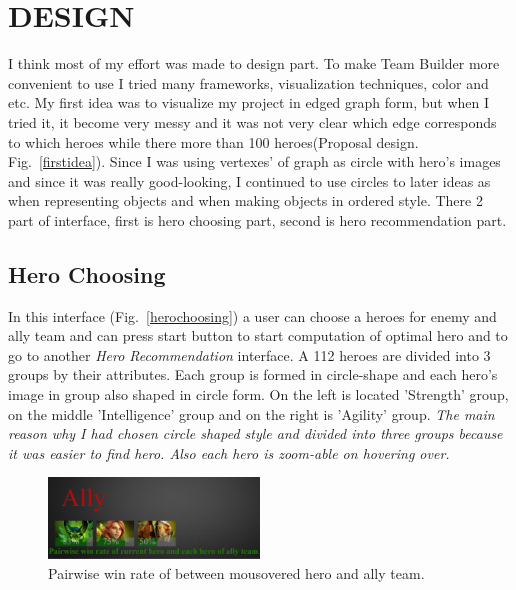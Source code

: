 \documentclass[twocolumn]{autart}    %
\begin{document}
\section{DESIGN}
I think most of my effort was made to design part. To make Team Builder more convenient to use I tried many frameworks, visualization techniques, color and etc. My first idea was to visualize my project in edged graph form, but when I tried it, it become very messy and it was not very clear which edge corresponds to which heroes while there more than 100 heroes(Proposal design. Fig.~\ref{firstidea}). Since I was using vertexes' of graph as circle with hero's images and since it was really good-looking, I continued to use circles to later ideas as when representing objects and when making objects in ordered style. There 2 part of interface, first is hero choosing part, second is hero recommendation part.



\subsection{Hero Choosing}
In this interface (Fig.~\ref{herochoosing}) a user can choose a heroes for  enemy and ally team and can press start button to start computation of optimal hero and to go to another \emph{Hero Recommendation} interface. A 112 heroes are divided into 3 groups by their attributes. Each group is formed in circle-shape and each hero's image in group also shaped in circle form. On the left is located 'Strength' group, on the middle 'Intelligence' group and on the right is 'Agility' group. \emph{The main reason why I had chosen circle shaped style and divided into three groups because it was easier to find hero. Also each hero is zoom-able on hovering over.}




\begin{figure}
  \centering
  
    \includegraphics[width=0.5\textwidth]{Pairwise.png}
\caption{Pairwise win rate of between mousovered hero and ally team.}
 \label{pairwise}
 
\end{figure}
\end{document}
